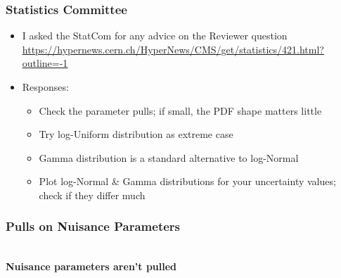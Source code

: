 \documentclass{beamer}
\begin{document}
\begin{frame}
\frametitle{Statistics Committee}
\begin{itemize}
  \item I asked the StatCom for any advice on the Reviewer question
        \textcolor{blue}{\tiny\underline{\url{https://hypernews.cern.ch/HyperNews/CMS/get/statistics/421.html?outline=-1}}}
  \item Responses:
  \begin{itemize}
    \item Check the parameter pulls; if small, the PDF shape matters little
    \item Try log-Uniform distribution as extreme case
    \item Gamma distribution is a standard alternative to log-Normal
    \item Plot log-Normal \& Gamma distributions for your uncertainty values; check if they differ much
  \end{itemize}
\end{itemize}
\begin{center}
\end{center}
\end{frame}

\begin{frame}
\frametitle{Pulls on Nuisance Parameters}
\begin{center}
        \\
        \vspace{1ex}
        \bf Nuisance parameters aren't pulled
\end{center}
\end{frame}
\end{document}
